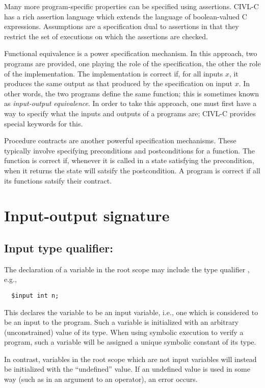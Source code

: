 Many more program-specific properties can be specified using
assertions. CIVL-C has a rich assertion language which extends the
language of boolean-valued C expressions. Assumptions are a
specification dual to assertions in that they restrict the set
of executions on which the assertions are checked.

Functional equivalence is a power specification mechanism. In this
approach, two programs are provided, one playing the role of the
specification, the other the role of the implementation. The
implementation is correct if, for all inputs $x$, it produces the same
output as that produced by the specification on input $x$. In other
words, the two programs define the same function; this is sometimes
known as \emph{input-output equivalence}. In order to take this
approach, one must first have a way to specify what the inputs and
outputs of a programs are; CIVL-C provides special keywords for this.

Procedure contracts are another powerful specification mechanisms.
These typically involve specifying preconditions and postconditions
for a function. The function is correct if, whenever it is called in a
state satisfying the precondition, when it returns the state will
satsify the postcondition. A program is correct if all its functions
satsify their contract.

\section{Input-output signature}

\subsection{Input type qualifier: \cinput}

The declaration of a variable in the root scope may
include the type qualifier \cinput, e.g.,
\begin{verbatim}
  $input int n;
\end{verbatim}
This declares the variable to be an input variable, i.e., one which is
considered to be an input to the program.  Such a variable is
initialized with an arbitrary (unconstrained) value of its type.  When
using symbolic execution to verify a program, such a variable will be
assigned a unique symbolic constant of its type.

In contrast, variables in the root scope which are not input variables
will instead be initialized with the ``undefined'' value.  If an
undefined value is used in some way (such as in an argument to an
operator), an error occurs.

